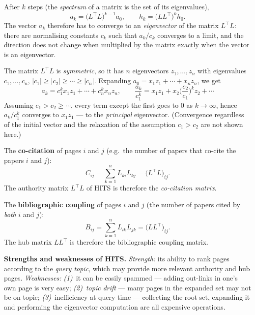 \documentclass[11pt,a4paper]{article}
\theoremstyle{definition}
\begin{document}
\begin{defbox}
After $k$ steps (the \emph{spectrum} of a matrix is the set of its eigenvalues),
\[ a_k=\big(L^{\!\top}L\big)^{k-1}a_0,\qquad h_k=\big(LL^{\!\top}\big)^{k}h_0. \]
The vector $a_k$ therefore has to converge to an \emph{eigenvector} of the matrix $L^{\!\top}L$:
there are normalising constants $c_k$ such that $a_k/c_k$ converges to a limit, and the direction
does not change when multiplied by the matrix exactly when the vector is an eigenvector.

The matrix $L^{\!\top}L$ is \emph{symmetric}, so it has $n$ eigenvectors $z_1,\dots,z_n$ with
eigenvalues $c_1,\dots,c_n$, $|c_1|\ge|c_2|\ge\cdots\ge|c_n|$. Expanding
$a_0=x_1z_1+\cdots+x_nz_n$, we get
\[ a_k=c_1^{k}x_1z_1+\cdots+c_n^{k}x_nz_n,\qquad
   \frac{a_k}{c_1^{k}}=x_1z_1+x_2\Big(\frac{c_2}{c_1}\Big)^{\!k}z_2+\cdots \]
Assuming $c_1>c_2\ge\cdots$, every term except the first goes to 0 as $k\to\infty$, hence
$a_k/c_1^k$ converges to $x_1z_1$ --- to the \emph{principal} eigenvector. (Convergence regardless of
the initial vector and the relaxation of the assumption $c_1>c_2$ are not shown here.)
\end{defbox}

\begin{defbox}
The \textbf{co-citation} of pages $i$ and $j$ (e.g.\ the number of papers that co-cite the papers $i$
and $j$):
\[ C_{ij}=\sum_{k=1}^{n}L_{ki}L_{kj}=\big(L^{\!\top}L\big)_{ij}. \]
The authority matrix $L^{\!\top}L$ of HITS is therefore the \emph{co-citation matrix}.

The \textbf{bibliographic coupling} of pages $i$ and $j$ (the number of papers cited by \emph{both}
$i$ and $j$):
\[ B_{ij}=\sum_{k=1}^{n}L_{ik}L_{jk}=\big(LL^{\!\top}\big)_{ij}. \]
The hub matrix $LL^{\!\top}$ is therefore the bibliographic coupling matrix.
\end{defbox}

\textbf{Strengths and weaknesses of HITS.} \emph{Strength:} its ability to rank pages according to the
\emph{query topic}, which may provide more relevant authority and hub pages. \emph{Weaknesses:}
\emph{(1)}~it can be easily spammed --- adding out-links in one's own page is very easy;
\emph{(2)}~\emph{topic drift} --- many pages in the expanded set may not be on topic;
\emph{(3)}~inefficiency at query time --- collecting the root set, expanding it and performing the
eigenvector computation are all expensive operations.
\end{document}
